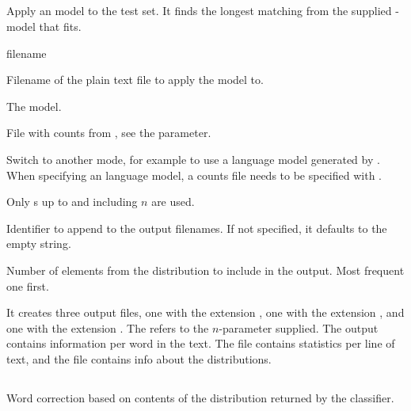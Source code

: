 \documentclass[a4paper,10pt,twoside]{report}
\begin{document}
\subsection{}

Apply an \ngram{} model to the test set. It finds the longest matching
\ngram{} from the supplied \ngram{}-model that fits.

\begin{varlist}{filename}
\item[filename] Filename of the plain text file to apply the model to.
\item[ngl] The \ngram{} model.
\item[ngc] File with counts from \srilm{}, see the 
  parameter.
\item[mode] Switch to another mode, for example  to
  use a language model generated by \srilm{}. When specifying an
  \srilm{} language model, a counts file needs to be specified with
  . 
\item[n] Only \ngram{}s up to and including $n$ are used.
\item[id] Identifier to append to the output filenames. If not
  specified, it defaults to the empty string.
\item[topn] Number of elements from the distribution to
  include in the output. Most frequent one first.
\end{varlist}

It creates three output files, one with the extension , one
with the extension , and one with the extension
. The  refers to the $n$-parameter supplied. The
 output contains information per word in the text. The
 file contains statistics per line of text, and the
 file contains info about the distributions.

\subsection{}

Word correction based on contents of the distribution returned by the
classifier.
\end{document}
